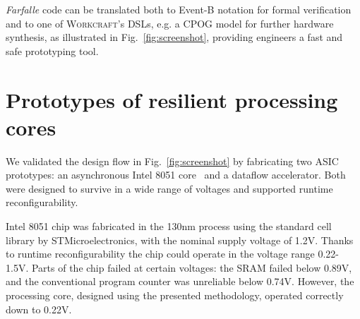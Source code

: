\documentclass[conference]{IEEEtran}
\begin{document}
\emph{Farfalle} code can be translated both to Event-B notation for formal
verification and to one of \textsc{Workcraft}'s DSLs, e.g. a CPOG model for
further hardware synthesis, as illustrated in Fig.~\ref{fig:screenshot},
providing engineers a fast and safe prototyping tool.

\vspace{-0.5mm}
\section{Prototypes of resilient processing cores\label{sec:experience}}
\vspace{-0.5mm}



We validated the design flow in Fig.~\ref{fig:screenshot} by fabricating two
ASIC prototypes: an asynchronous Intel 8051 core~\cite{rec-proc} and a dataflow
accelerator. Both were designed to survive in a wide range of voltages and supported
runtime reconfigurability.

Intel 8051 chip was fabricated in the 130nm process using the standard cell
library by STMicroelectronics, with the nominal supply voltage of 1.2V. Thanks
to runtime reconfigurability the chip could operate
in the voltage range 0.22-1.5V. Parts of the chip failed at certain voltages:
the SRAM failed below 0.89V, and the
conventional program counter was unreliable below 0.74V. However, the
processing core, designed using the presented methodology, operated
correctly down to 0.22V.
\end{document}
